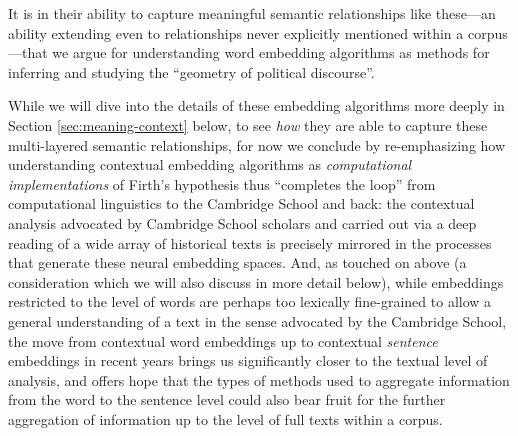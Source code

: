 \documentclass[11pt]{article}
\newcommand{\entity}[1]{\texttt{#1}}
\begin{document}
	
It is in their ability to capture meaningful semantic relationships like these---an ability extending even to relationships never explicitly mentioned within a corpus---that we argue for understanding word embedding algorithms as methods for inferring and studying the ``geometry of political discourse''.
	



	
While we will dive into the details of these embedding algorithms more deeply in Section \ref{sec:meaning-context} below, to see \textit{how} they are able to capture these multi-layered semantic relationships, for now we conclude by re-emphasizing how understanding contextual embedding algorithms as \textit{computational implementations} of Firth's hypothesis thus ``completes the loop'' from computational linguistics to the Cambridge School and back: the contextual analysis advocated by Cambridge School scholars and carried out via a deep reading of a wide array of historical texts is precisely mirrored in the processes that generate these neural embedding spaces. And, as touched on above (a consideration which we will also discuss in more detail below), while embeddings restricted to the level of words are perhaps too lexically fine-grained to allow a general understanding of a text in the sense advocated by the Cambridge School, the move from contextual word embeddings up to contextual \textit{sentence} embeddings in recent years brings us significantly closer to the textual level of analysis, and offers hope that the types of methods used to aggregate information from the word to the sentence level could also bear fruit for the further aggregation of information up to the level of full texts within a corpus.
\end{document}
